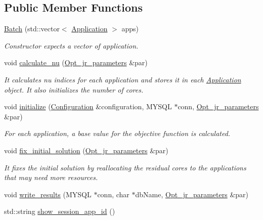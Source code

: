\subsection*{Public Member Functions}
\begin{DoxyCompactItemize}
\item 
\hyperlink{classBatch_aea459d16c99c2f02af53b3ad5b0ff12d}{Batch} (std\-::vector$<$ \hyperlink{classApplication}{Application} $>$ apps)
\begin{DoxyCompactList}\small\item\em Constructor expects a vector of application. \end{DoxyCompactList}\item 
void \hyperlink{classBatch_a5174213a71d9f45cc10fee6bacd04b09}{calculate\-\_\-nu} (\hyperlink{classOpt__jr__parameters}{Opt\-\_\-jr\-\_\-parameters} \&par)
\begin{DoxyCompactList}\small\item\em It calculates nu indices for each application and stores it in each \hyperlink{classApplication}{Application} object. It also initializes the number of cores. \end{DoxyCompactList}\item 
void \hyperlink{classBatch_a025d1f919a65cda556c99db8b6cdff42}{initialize} (\hyperlink{classConfiguration}{Configuration} \&configuration, M\-Y\-S\-Q\-L $\ast$conn, \hyperlink{classOpt__jr__parameters}{Opt\-\_\-jr\-\_\-parameters} \&par)
\begin{DoxyCompactList}\small\item\em For each application, a base value for the objective function is calculated. \end{DoxyCompactList}\item 
void \hyperlink{classBatch_a2af18c30d72b6598eba353e8daef0b80}{fix\-\_\-initial\-\_\-solution} (\hyperlink{classOpt__jr__parameters}{Opt\-\_\-jr\-\_\-parameters} \&par)
\begin{DoxyCompactList}\small\item\em It fixes the initial solution by reallocating the residual cores to the applications that may need more resources. \end{DoxyCompactList}\item 
void \hyperlink{classBatch_a5e45cac0fbad47fde645547351fe3c75}{write\-\_\-results} (M\-Y\-S\-Q\-L $\ast$conn, char $\ast$db\-Name, \hyperlink{classOpt__jr__parameters}{Opt\-\_\-jr\-\_\-parameters} \&par)
\item 
std\-::string \hyperlink{classBatch_a7bb052d7d9fd3cfe1a00ebd60f977afb}{show\-\_\-session\-\_\-app\-\_\-id} ()

\end{DoxyCompactItemize}
